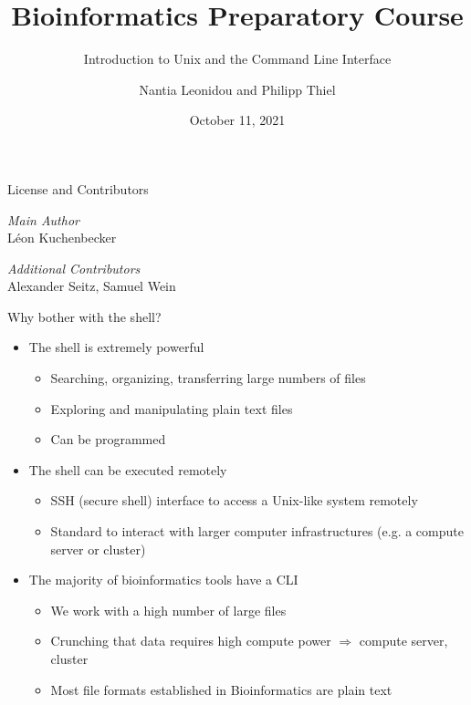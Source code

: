\documentclass[aspectratio=1610]{beamer}
\title{Bioinformatics Preparatory Course}
\subtitle{Introduction to Unix and the Command Line Interface}
\author{Nantia Leonidou and Philipp Thiel}
\date{October 11, 2021}
\begin{document}

\begin{frame}
    \titlepage
\end{frame}

\begin{frame}{License and Contributors}
    \medskip

    \emph{Main Author}\\
    Léon Kuchenbecker

    \emph{Additional Contributors}\\
    Alexander Seitz, Samuel Wein
\end{frame}



\begin{frame}[c]{Why bother with the shell?}
    \begin{itemize}[<+->]\setlength\itemsep{1em}
        \item The shell is extremely powerful

            \begin{itemize}[<.->]
                \item Searching, organizing, transferring large numbers of files
                \item Exploring and manipulating plain text files
                \item Can be programmed
            \end{itemize}

        \item The shell can be executed remotely

            \begin{itemize}[<.->]
                \item SSH (secure shell) interface to access a Unix-like system remotely
                \item Standard to interact with larger computer infrastructures (e.g. a compute
                    server or cluster)
            \end{itemize}

        \item The majority of bioinformatics tools have a CLI
            \begin{itemize}[<.->]
                \item We work with a high number of large files
                \item Crunching that data requires high compute power $\Rightarrow$ compute server,
                    cluster
                \item Most file formats established in Bioinformatics are plain text
            \end{itemize}
    \end{itemize}
\end{frame}
\end{document}
